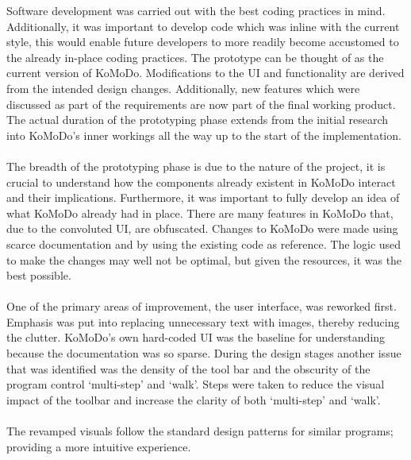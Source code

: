   Software development was carried out with the best coding practices in mind. Additionally, it was important to develop code which was inline with the current style, this would enable future developers to more readily become accustomed to the already in-place coding practices.
  The prototype can be thought of as the current version of KoMoDo. Modifications to the UI and functionality are derived from the intended design changes. Additionally, new features which were discussed as part of the requirements are now part of the final working product. The actual duration of the prototyping phase extends from the initial research into KoMoDo's inner workings all the way up to the start of the implementation. \\\\
  The breadth of the prototyping phase is due to the nature of the project, it is crucial to understand how the components already existent in KoMoDo interact and their implications. Furthermore, it was important to fully develop an idea of what KoMoDo already had in place. There are many features in KoMoDo that, due to the convoluted UI, are obfuscated.
  Changes to KoMoDo were made using scarce  documentation and by using the existing code as reference. The logic used to make the changes may well not be optimal, but given the resources, it was the best possible.\\\\
  One of the primary areas of improvement, the user interface, was reworked first. Emphasis was put into replacing unnecessary text with images, thereby reducing the clutter. KoMoDo's own hard-coded UI was the baseline for understanding  because the documentation was so sparse.
  During the design stages another issue that was identified was the density of the tool bar and the obscurity of the program control `multi-step' and `walk'. Steps were taken to reduce the visual impact of the toolbar and increase the clarity of both `multi-step' and `walk'.\\\\
  The revamped visuals follow the standard design patterns for similar programs; providing a more intuitive experience.\\\\
